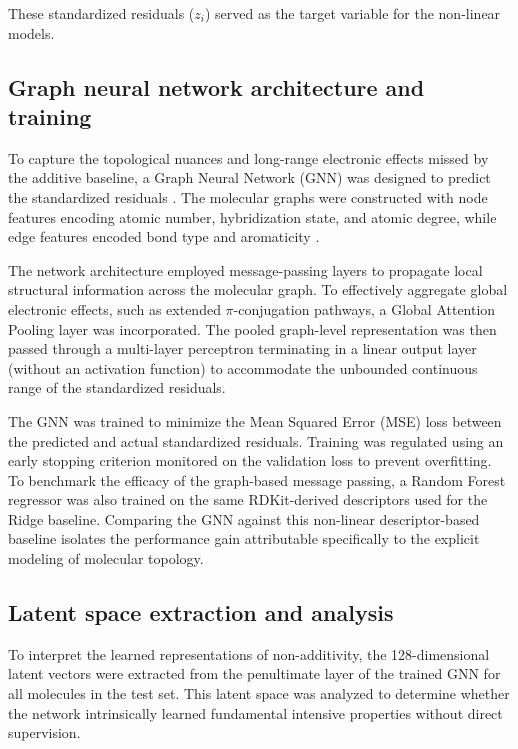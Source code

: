 \documentclass[]{article}
\begin{document}
These standardized residuals ($z_i$) served as the target variable for the non-linear models.

\subsection{Graph neural network architecture and training}
To capture the topological nuances and long-range electronic effects missed by the additive baseline, a Graph Neural Network (GNN) was designed to predict the standardized residuals \citep{gilmer2017neuralmessagepassingquantum,ma2020multiviewgraphneuralnetworks}. The molecular graphs were constructed with node features encoding atomic number, hybridization state, and atomic degree, while edge features encoded bond type and aromaticity \citep{ma2020multiviewgraphneuralnetworks,nguyen2026mmgnnmultilevelmulticolorgraph}.

The network architecture employed message-passing layers to propagate local structural information across the molecular graph. \citep{gilmer2017neuralmessagepassingquantum,berry2025surveygraphneuralnetworks} To effectively aggregate global electronic effects, such as extended $\pi$-conjugation pathways, a Global Attention Pooling layer was incorporated. \citep{jo2021flexibledualbranchedmessagepassing,pescia2023messagepassingneuralquantumstates} The pooled graph-level representation was then passed through a multi-layer perceptron terminating in a linear output layer (without an activation function) to accommodate the unbounded continuous range of the standardized residuals. \citep{gilmer2017neuralmessagepassingquantum,liu2026localglobalmultimodalcontrastivelearning}

The GNN was trained to minimize the Mean Squared Error (MSE) loss between the predicted and actual standardized residuals. Training was regulated using an early stopping criterion monitored on the validation loss to prevent overfitting. To benchmark the efficacy of the graph-based message passing, a Random Forest regressor was also trained on the same RDKit-derived descriptors used for the Ridge baseline. Comparing the GNN against this non-linear descriptor-based baseline isolates the performance gain attributable specifically to the explicit modeling of molecular topology.

\subsection{Latent space extraction and analysis}
To interpret the learned representations of non-additivity, the 128-dimensional latent vectors were extracted from the penultimate layer of the trained GNN for all molecules in the test set. This latent space was analyzed to determine whether the network intrinsically learned fundamental intensive properties without direct supervision.
\end{document}
